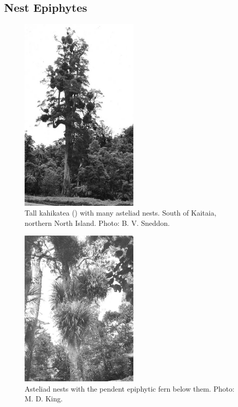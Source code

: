 \subsection{Nest Epiphytes}

\begin{figure}
	\includegraphics[width=0.5\textwidth]{graphics/figure39kahikatea.jpg}
	\centering
	\caption[Tall kahikatea with many asteliad nests]{Tall kahikatea () with many asteliad nests.
    South of Kaitaia, northern North Island.
	Photo: B. V. Sneddon.}
	\label{fig:39kahikatea}
\end{figure}

\begin{figure}
	\includegraphics[width=0.5\textwidth]{graphics/figure40asteliad.jpg}
	\centering
	\caption[Asteliad nests with the pendent epiphytic fern]{Asteliad nests with the pendent epiphytic fern  below them.
	Photo: M. D. King.}
	\label{fig:40asteliad}
\end{figure}

